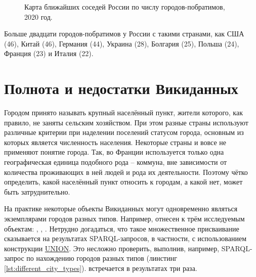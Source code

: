 \begin{figure*}[h]
{
\setlength{\fboxsep}{0pt}%
\setlength{\fboxrule}{1pt}%
}
	\caption{Карта ближайших соседей России по числу городов-побратимов, 2020 год.}
	\label{fig:Map_closest_neighbours_Russia}
\end{figure*}

Больше двадцати городов-побратимов у России с такими странами, как США (46), Китай (46), Германия (44), Украина (28), Болгария (25), Польша (24), Франция (23) и Италия (22).

\section{Полнота и недостатки Викиданных}

Городом принято называть крупный населённый пункт, жители которого, как правило, не заняты сельским хозяйством. При этом разные страны используют различные критерии при наделении поселений статусом города, основным из которых является численность населения. Некоторые страны и вовсе не применяют понятие города. Так, во Франции используется только одна географическая единица подобного рода -- коммуна, вне зависимости от количества проживающих в ней людей и рода их деятельности. Поэтому чётко определить, какой населённый пункт относить к городам, а какой нет, может быть затруднительно.

На практике некоторые объекты Викиданных могут одновременно являться экземплярами городов разных типов. Например,  отнесен к трём исследуемым объектам: , , . Нетрудно догадаться, что такое множественное присваивание сказывается на результатах SPARQL-запросов, в частности, с использованием конструкции \href{https://en.wikibooks.org/wiki/SPARQL/UNION}{UNION}. Это несложно проверить, выполнив, например, SPARQL-запрос по нахождению городов разных типов (линстинг \ref{lst:different_city_types}).  встречается в результатах три раза. 

